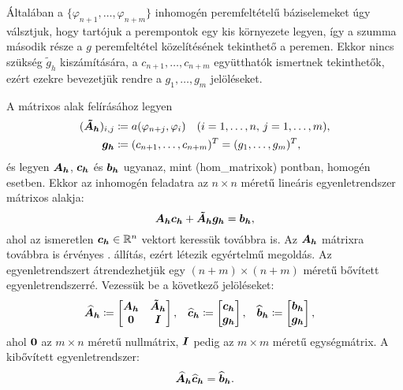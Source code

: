Általában a $\{\varphi_{n+1}, \ldots, \varphi_{n+m}\}$ inhomogén peremfeltételű báziselemeket úgy válsztjuk, hogy tartójuk a perempontok egy kis környezete legyen, így a szumma második része a $g$ peremfeltétel közelítésének tekinthető a peremen. Ekkor nincs szükség $\tilde{g}_h$ kiszámítására, a $c_{n+1}, \ldots, c_{n+m}$ együtthatók ismertnek tekinthetők, ezért ezekre bevezetjük rendre a $g_{1}, \ldots, g_{m}$ jelöléseket.

A mátrixos alak felírásához legyen
\begin{equation}\label{inhom_matrixok}
	\begin{aligned}
		(\bm{\tilde{A}_h})_{i,j} &\coloneqq a(\varphi_{n+j},\varphi_i) \quad (i = 1, \ldots, n, \, j = 1, \ldots, m),\\ 
		\bm{g_h} &\coloneqq (c_{n+1}, \ldots, c_{n+m})^T = (g_{1}, \ldots, g_{m})^T,
	\end{aligned}
\end{equation}
 és legyen $\bm{A_h}$, $\bm{c_h}$ és $\bm{b_h}$ ugyanaz, mint \aref({hom_matrixok}) pontban, homogén esetben. Ekkor az inhomogén feladatra az $n \times n$ méretű lineáris egyenletrendszer mátrixos alakja:
 \begin{equation}\label{inhom_ler}
	\bm{A_h}\bm{c_h} + \bm{\tilde{A}_h} \bm{g_h} = \bm{b_h}, 
 \end{equation}
ahol az ismeretlen $\bm{c_h} \in \mathbb{R}^n$ vektort keressük továbbra is. Az $\bm{A_h}$ mátrixra továbbra is érvényes . állítás, ezért létezik egyértelmű megoldás. Az egyenletrendszert átrendezhetjük egy $(n+m) \times (n+m)$ méretű bővített egyenletrendszerré. Vezessük be a következő jelöléseket: 
\begin{align}\label{inhom_mx_def}
	&\bm{\widehat{A}_h} \coloneqq 
		\begin{bmatrix}
			\bm{A_h} & \bm{\tilde{A}_h} \\
			\bm{0} & \bm{I}
		\end{bmatrix},&
	&\bm{\widehat{c}_h} \coloneqq 
		\begin{bmatrix}
			\bm{c_h} \\ 
			\bm{g_h}
		\end{bmatrix},& 
	&\bm{\widehat{b}_h} \coloneqq 
		\begin{bmatrix}
			\bm{b_h} \\
			\bm{g_h}
		\end{bmatrix},&
 \end{align}
ahol $\bm{0}$ az $m \times n$ méretű nullmátrix, $\bm{I}$ pedig az $m \times m$ méretű egységmátrix. A kibővített egyenletrendszer:
\begin{equation}\label{inhom_dirichlet_egyrendszer}
	\bm{\widehat{A}_h} \bm{\widehat{c}_h}  = \bm{\widehat{b}_h}.
 \end{equation}

